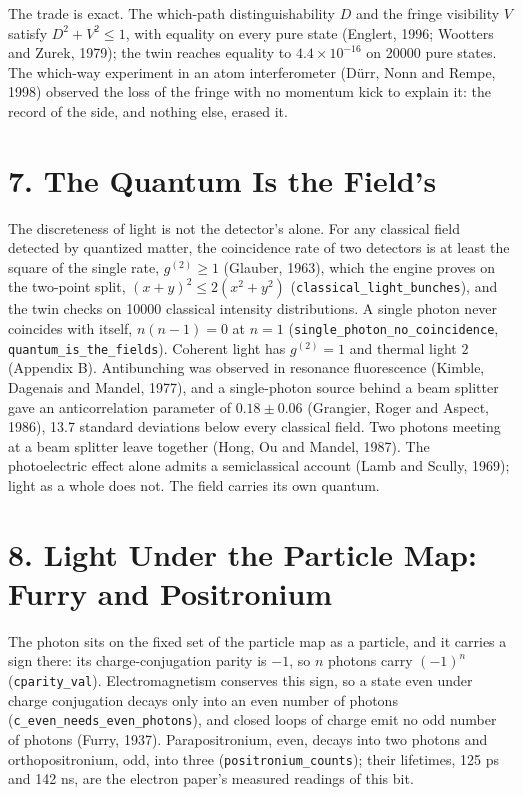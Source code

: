 \documentclass[10pt]{article}
\begin{document}
The trade is exact. The which-path distinguishability \(D\) and the
fringe visibility \(V\) satisfy \(D^2+V^2\le1\), with equality on every
pure state (Englert, 1996; Wootters and Zurek, 1979); the twin reaches
equality to \(4.4\times10^{-16}\) on 20000 pure states. The which-way
experiment in an atom interferometer (Dürr, Nonn and Rempe, 1998)
observed the loss of the fringe with no momentum kick to explain it: the
record of the side, and nothing else, erased it.

\hypertarget{the-quantum-is-the-fields}{%
\section{7. The Quantum Is the
Field's}\label{the-quantum-is-the-fields}}

The discreteness of light is not the detector's alone. For any classical
field detected by quantized matter, the coincidence rate of two
detectors is at least the square of the single rate, \(g^{(2)}\ge1\)
(Glauber, 1963), which the engine proves on the two-point split,
\((x+y)^2\le2(x^2+y^2)\) (\texttt{classical\_light\_bunches}), and the
twin checks on 10000 classical intensity distributions. A single photon
never coincides with itself, \(n(n-1)=0\) at \(n=1\)
(\texttt{single\_photon\_no\_coincidence},
\texttt{quantum\_is\_the\_fields}). Coherent light has \(g^{(2)}=1\) and
thermal light \(2\) (Appendix B). Antibunching was observed in resonance
fluorescence (Kimble, Dagenais and Mandel, 1977), and a single-photon
source behind a beam splitter gave an anticorrelation parameter of
\(0.18\pm0.06\) (Grangier, Roger and Aspect, 1986), 13.7 standard
deviations below every classical field. Two photons meeting at a beam
splitter leave together (Hong, Ou and Mandel, 1987). The photoelectric
effect alone admits a semiclassical account (Lamb and Scully, 1969);
light as a whole does not. The field carries its own quantum.

\hypertarget{light-under-the-particle-map-furry-and-positronium}{%
\section{8. Light Under the Particle Map: Furry and
Positronium}\label{light-under-the-particle-map-furry-and-positronium}}

The photon sits on the fixed set of the particle map as a particle, and
it carries a sign there: its charge-conjugation parity is \(-1\), so
\(n\) photons carry \((-1)^n\) (\texttt{cparity\_val}). Electromagnetism
conserves this sign, so a state even under charge conjugation decays
only into an even number of photons
(\texttt{c\_even\_needs\_even\_photons}), and closed loops of charge
emit no odd number of photons (Furry, 1937). Parapositronium, even,
decays into two photons and orthopositronium, odd, into three
(\texttt{positronium\_counts}); their lifetimes, 125 ps and 142 ns, are
the electron paper's measured readings of this bit.
\end{document}
